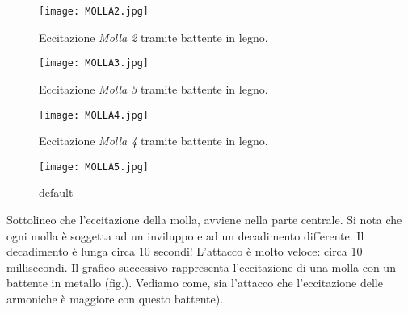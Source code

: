 \begin{figure}[htbp]
\begin{center}
\texttt{[image: MOLLA2.jpg]}
\caption{Eccitazione \textit{Molla 2} tramite battente in legno.}
\label{default}
\end{center}
\end{figure}

\begin{figure}[htbp]
\begin{center}
\texttt{[image: MOLLA3.jpg]}
\caption{Eccitazione \textit{Molla 3} tramite battente in legno.}
\label{default}
\end{center}
\end{figure}

\begin{figure}[htbp]
\begin{center}
\texttt{[image: MOLLA4.jpg]}
\caption{Eccitazione \textit{Molla 4} tramite battente in legno.}
\label{default}
\end{center}
\end{figure}

\begin{figure}[htbp]
\begin{center}
\texttt{[image: MOLLA5.jpg]}
\caption{default}
\label{default}
\end{center}
\end{figure}

Sottolineo che l'eccitazione della molla, avviene nella parte centrale.
Si nota che ogni molla è soggetta ad un inviluppo e ad un decadimento differente. Il decadimento è lunga circa 10 secondi! L'attacco è molto veloce: circa 10 millisecondi. Il grafico successivo rappresenta l'eccitazione di una molla con un battente in metallo (fig.). Vediamo come, sia l'attacco che l'eccitazione delle armoniche è maggiore con questo battente).

